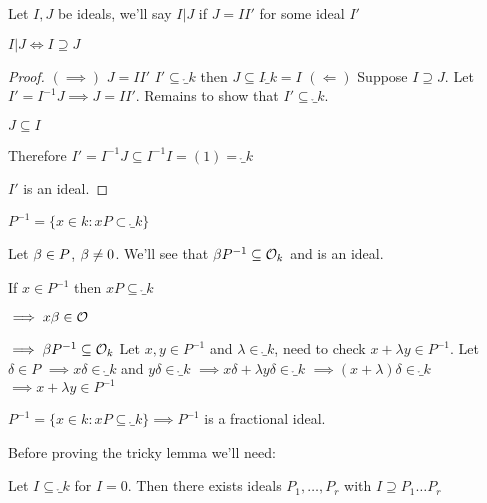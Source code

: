 \documentclass[11pt]{article}
\begin{document}
\begin{defn}
Let $I,J$ be ideals, we'll say $I| J$ if $J = II'$ for some ideal $I'$
\end{defn}
\begin{cor}
$I|J \iff I \supseteq J$
\end{cor}
\begin{proof}
	$(\implies)$ \hspace{7pt} $ J = II'$ \hspace{7pt}  $I'\subseteq \ring_k$ then $J \subseteq I \ring_k = I$
\spac
	$(\Longleftarrow)$ Suppose $I \supseteq J$. 
	Let $I' = I^{-1} J \implies J = II' $. 
	Remains to show that $I' \subseteq \ring_k$.
	\spa

	$J \subseteq I$
	\spa
	
	Therefore $I' = I^{-1}J \subseteq I^{-1} I = (1) = \ring_k$
	\spa

	$I'$ is an ideal.

\end{proof}


\begin{defn}
	$P^{-1} = \{ x \in k : xP \subset \ring_k\}$
\end{defn}

Let $\beta \in P$, $\beta \neq 0$.
We'll see that $\beta P^{-1} \subseteq \mathcal{O}_k$ and is an ideal.
\spa

If $x \in P^{-1} $ then $xP \subseteq \ring_k$

$\implies x\beta \in \mathcal{O}$

$\implies \beta P^{-1} \subseteq \mathcal{O}_k$
\spac
Let $x,y \in P^{-1} $ and  $\lambda \in \ring_k$, need to check $x+ \lambda y \in P^{-1}$.
\spac
Let $\delta \in P$
 \spac
 $\implies x \delta \in \ring_k$ and $y \delta \in \ring_k$
 \spac
 $\implies x\delta + \lambda y \delta \in \ring_k$
 \spac
 $\implies (x+\lambda ) \delta \in \ring_k$
 \spac
 $\implies x+ \lambda y \in P^{-1} $

\begin{defn}
	$P^{-1} = \{ x \in k : xP \subseteq \ring_k \} \implies P^{-1}$ is a fractional ideal.
\end{defn}
\spa
Before proving the tricky lemma we'll need:

\begin{lemma}
Let $I \subseteq \ring_k $ for $I=0$. Then there exists ideals $P_1, \dots, P_r$ with $I \supseteq P_1 \dots P_r$ 
\end{lemma}
\end{document}
